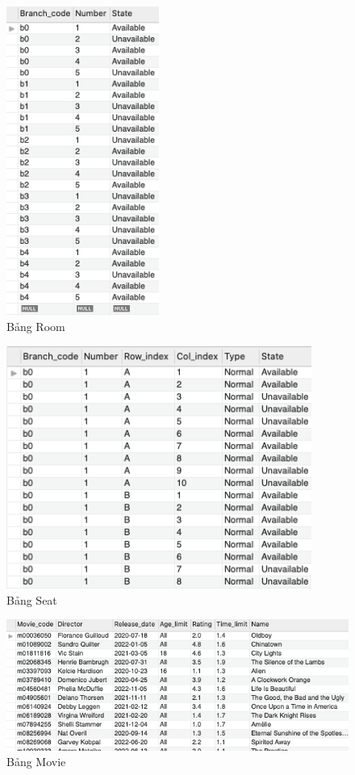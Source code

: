 \begin{figure}[H]
    \centering
    \includegraphics[width=5cm]{images/ROOM.png}
    \caption{Bảng Room}
\end{figure}

\begin{figure}[H]
    \centering
    \includegraphics[width=10cm]{images/SEAT.png}
    \caption{Bảng Seat}
\end{figure}

\begin{figure}[H]
    \centering
    \includegraphics[width=\textwidth]{images/MOVIE.png}
    \caption{Bảng Movie}
\end{figure}

